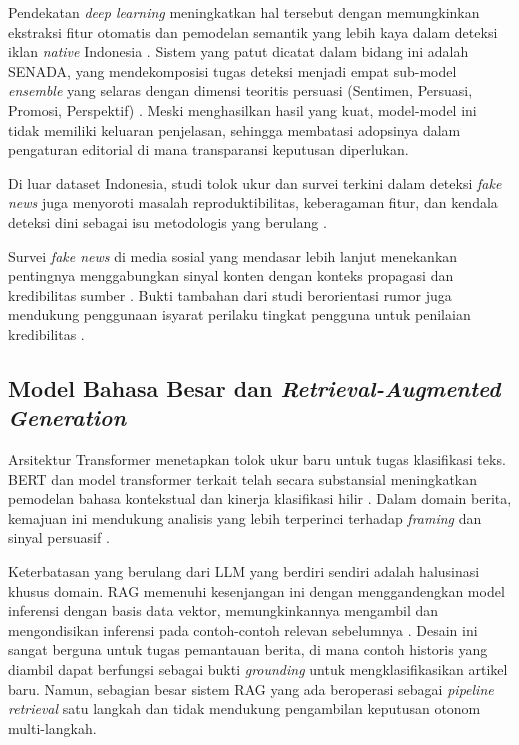 \documentclass{ieeeaccess}
\begin{document}
Pendekatan \textit{deep learning} meningkatkan hal tersebut dengan memungkinkan ekstraksi fitur otomatis dan pemodelan semantik yang lebih kaya dalam deteksi iklan \textit{native} Indonesia \cite{b18, b19}. Sistem yang patut dicatat dalam bidang ini adalah SENADA, yang mendekomposisi tugas deteksi menjadi empat sub-model \textit{ensemble} yang selaras dengan dimensi teoritis persuasi (Sentimen, Persuasi, Promosi, Perspektif) \cite{b19}. Meski menghasilkan hasil yang kuat, model-model ini tidak memiliki keluaran penjelasan, sehingga membatasi adopsinya dalam pengaturan editorial di mana transparansi keputusan diperlukan.

Di luar dataset Indonesia, studi tolok ukur dan survei terkini dalam deteksi \textit{fake news} juga menyoroti masalah reproduktibilitas, keberagaman fitur, dan kendala deteksi dini sebagai isu metodologis yang berulang \cite{b52, b55}.

Survei \textit{fake news} di media sosial yang mendasar lebih lanjut menekankan pentingnya menggabungkan sinyal konten dengan konteks propagasi dan kredibilitas sumber \cite{b60, b62}. Bukti tambahan dari studi berorientasi rumor juga mendukung penggunaan isyarat perilaku tingkat pengguna untuk penilaian kredibilitas \cite{b61, b66}.

\subsection{Model Bahasa Besar dan \textit{Retrieval-Augmented Generation}}
Arsitektur Transformer \cite{b23} menetapkan tolok ukur baru untuk tugas klasifikasi teks. BERT dan model transformer terkait telah secara substansial meningkatkan pemodelan bahasa kontekstual dan kinerja klasifikasi hilir \cite{b39}. Dalam domain berita, kemajuan ini mendukung analisis yang lebih terperinci terhadap \textit{framing} dan sinyal persuasif \cite{b8, b9}.

Keterbatasan yang berulang dari LLM yang berdiri sendiri adalah halusinasi khusus domain. RAG memenuhi kesenjangan ini dengan menggandengkan model inferensi dengan basis data vektor, memungkinkannya mengambil dan mengondisikan inferensi pada contoh-contoh relevan sebelumnya \cite{b25}. Desain ini sangat berguna untuk tugas pemantauan berita, di mana contoh historis yang diambil dapat berfungsi sebagai bukti \textit{grounding} untuk mengklasifikasikan artikel baru. Namun, sebagian besar sistem RAG yang ada beroperasi sebagai \textit{pipeline} \textit{retrieval} satu langkah dan tidak mendukung pengambilan keputusan otonom multi-langkah.
\end{document}
